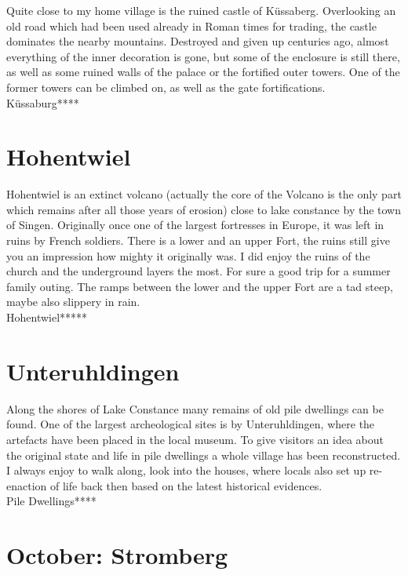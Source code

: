 Quite close to my home village is the ruined castle of K\"ussaberg. Overlooking an old road which had been used already in Roman times for trading, the castle dominates the nearby mountains. Destroyed and given up centuries ago, almost everything of the inner decoration is gone, but some of the enclosure is still there, as well as some ruined walls of the palace or the fortified outer towers. One of the former towers can be climbed on, as well as the gate fortifications.\\

K\"ussaburg****

\section{Hohentwiel}
\label{1996:Hohentwiel}

Hohentwiel is an extinct volcano (actually the core of the Volcano is the only part which remains after all those years of erosion) close to lake constance by the town of Singen. Originally once one of the largest fortresses in Europe, it was left in ruins by French soldiers. There is a lower and an upper Fort, the ruins still give you an impression how mighty it originally was. I did enjoy the ruins of the church and the underground layers the most. For sure a good trip for a summer family outing. The ramps between the lower and the upper Fort are a tad steep, maybe also slippery in rain.\\

Hohentwiel*****

\section{Unteruhldingen}
\label{1996:Unteruhldingen}

Along the shores of Lake Constance many remains of old pile dwellings can be found. One of the largest archeological sites is by Unteruhldingen, where the artefacts have been placed in the local museum. To give visitors an idea about the original state and life in pile dwellings a whole village has been reconstructed. I always enjoy to walk along, look into the houses, where locals also set up re-enaction of life back then based on the latest historical evidences.\\

Pile Dwellings****


\section{October: Stromberg}
\label{1996:Stromberg}

